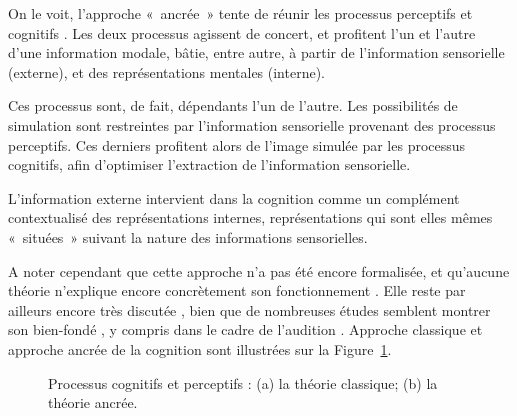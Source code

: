 On le voit, l'approche «~ancrée~» tente de réunir les processus perceptifs et cognitifs \citep{goldstone1998reuniting}. Les deux processus agissent de concert, et profitent l'un et l'autre d'une information modale, bâtie, entre autre, à partir de l'information sensorielle (externe), et des représentations mentales (interne).

Ces processus sont, de fait, dépendants l'un de l'autre. Les possibilités de simulation sont restreintes par l'information sensorielle provenant des processus perceptifs. Ces derniers profitent alors de l'image simulée par les processus cognitifs, afin d'optimiser l'extraction de l'information sensorielle.

L'information externe intervient dans la cognition comme un complément contextualisé des représentations internes, représentations qui sont elles mêmes «~situées~» suivant la nature des informations sensorielles.

A noter cependant que cette approche n'a pas été encore formalisée, et qu'aucune théorie n'explique encore concrètement son fonctionnement \citep{barsalou2010grounded}. Elle reste par ailleurs encore très discutée \citep{leshinskaya2016cognitive,barsalou2016staying}, bien que de nombreuses études semblent montrer son bien-fondé \citep{barsalou1999perceptions,barsalou2003abstraction,barsalou2010grounded}, y compris dans le cadre de l'audition \citep{kiefer2008sound}. 
Approche classique et approche ancrée de la cognition sont illustrées sur la Figure~\ref{fig:processusPercepAndCo}.

\begin{figure}[t]
         \myfloatalign
         \par
        \caption[Processus cognitifs et perceptifs.]{Processus cognitifs et perceptifs : (a) la théorie classique; (b) la théorie ancrée.}
        \label{fig:processusPercepAndCo}
\end{figure}

